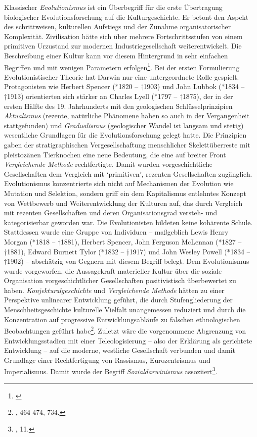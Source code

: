\documentclass[openany,twoside,twocolumn]{book}
\let\rmarkdownfootnote\footnote%
\def\footnote{\protect\rmarkdownfootnote}
\begin{document}
Klassischer \emph{Evolutionismus} ist ein Überbegriff für die erste Übertragung biologischer Evolutionsforschung auf die Kulturgeschichte. Er betont den Aspekt des schrittweisen, kulturellen Aufstiegs und der Zunahme organisatorischer Komplexität. Zivilisation hätte sich über mehrere Fortschrittsstufen von einem primitiven Urzustand zur modernen Industriegesellschaft weiterentwickelt. Die Beschreibung einer Kultur kann vor diesem Hintergrund in sehr einfachen Begriffen und mit wenigen Parametern erfolgen\footnote{\textcite{noauthor_evolutionismus_1986}}. Bei der ersten Formulierung Evolutionistischer Theorie hat Darwin nur eine untergeordnete Rolle gespielt. Protagonisten wie Herbert Spencer (*1820 -- †1903) und John Lubbok (*1834 -- †1913) orientierten sich stärker an Charles Lyell (*1797 -- †1875), der in der ersten Hälfte des 19. Jahrhunderts mit den geologischen Schlüsselprinzipien \emph{Aktualismus} (rezente, natürliche Phänomene haben so auch in der Vergangenheit stattgefunden) und \emph{Gradualismus} (geologischer Wandel ist langsam und stetig) wesentliche Grundlagen für die Evolutionsforschung gelegt hatte. Die Prinzipien gaben der stratigraphischen Vergesellschaftung menschlicher Skelettüberreste mit pleistozänen Tierknochen eine neue Bedeutung, die eine auf breiter Front \emph{Vergleichende Methode} rechtfertigte. Damit wurden vorgeschichtliche Gesellschaften dem Vergleich mit `primitiven', rezenten Gesellschaften zugänglich. Evolutionismus konzentrierte sich nicht auf Mechanismen der Evolution wie Mutation und Selektion, sondern griff ein dem Kapitalismus entlehntes Konzept von Wettbewerb und Weiterentwicklung der Kulturen auf, das durch Vergleich mit rezenten Gesellschaften und deren Organisationsgrad versteh- und kategorisierbar geworden war. Die Evolutionisten bildeten keine kohärente Schule. Stattdessen wurde eine Gruppe von Individuen -- maßgeblich Lewis Henry Morgan (*1818 -- †1881), Herbert Spencer, John Ferguson McLennan (*1827 -- †1881), Edward Burnett Tylor (*1832 -- †1917) und John Wesley Powell (*1834 -- †1902) -- abschätzig von Gegnern mit diesem Begriff belegt. Dem Evolutionismus wurde vorgeworfen, die Aussagekraft materieller Kultur über die soziale Organisation vorgeschichtlicher Gesellschaften positivistisch überbewertet zu haben. \emph{Konjekturalgeschichte} und \emph{Vergleichende Methode} hätten zu einer Perspektive unlinearer Entwicklung geführt, die durch Stufengliederung der Menschheitsgeschichte kulturelle Vielfalt unangemessen reduziert und durch die Konzentration auf progressive Entwicklungsabläufe zu falschen ethnologischen Beobachtungen geführt habe\footnote{\textcite{petermann_geschichte_2004}, 464-474, 734.}. Zuletzt wäre die vorgenommene Abgrenzung von Entwicklungsstadien mit einer Teleologisierung -- also der Erklärung als gerichtete Entwicklung -- auf die moderne, westliche Gesellschaft verbunden und damit Grundlage einer Rechtfertigung von Rassismus, Eurozentrismus und Imperialismus. Damit wurde der Begriff \emph{Sozialdarwinismus} assoziiert\footnote{\textcite{ShennanGenesmemeshuman2002}, 11.}.
\end{document}
